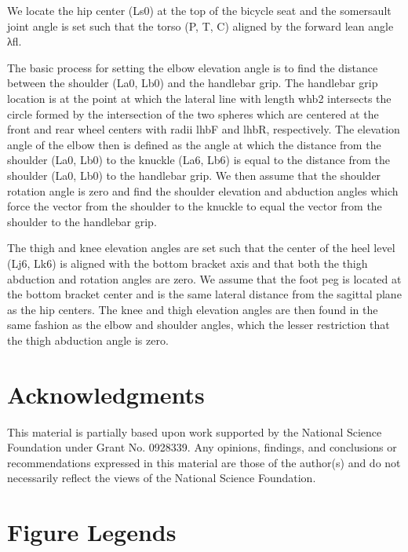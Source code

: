 \documentclass[10pt]{article}
\begin{document}
We locate the hip center (Ls0) at the top of the bicycle seat and the
somersault joint angle is set such that the torso (P, T, C) aligned by the
forward lean angle λfl.

The basic process for setting the elbow elevation angle is to find the distance
between the shoulder (La0, Lb0) and the handlebar grip. The handlebar grip
location is at the point at which the lateral line with length whb2 intersects
the circle formed by the intersection of the two spheres which are centered at
the front and rear wheel centers with radii lhbF and lhbR, respectively. The
elevation angle of the elbow then is defined as the angle at which the distance
from the shoulder (La0, Lb0) to the knuckle (La6, Lb6) is equal to the distance
from the shoulder (La0, Lb0) to the handlebar grip. We then assume that the
shoulder rotation angle is zero and find the shoulder elevation and abduction
angles which force the vector from the shoulder to the knuckle to equal the
vector from the shoulder to the handlebar grip.

The thigh and knee elevation angles are set such that the center of the heel
level (Lj6, Lk6) is aligned with the bottom bracket axis and that both the
thigh abduction and rotation angles are zero. We assume that the foot peg is
located at the bottom bracket center and is the same lateral distance from the
sagittal plane as the hip centers. The knee and thigh elevation angles are then
found in the same fashion as the elbow and shoulder angles, which the lesser
restriction that the thigh abduction angle is zero.

\section*{Acknowledgments}
This material is partially based upon work supported by the National Science
Foundation under Grant No. 0928339. Any opinions, findings, and conclusions or
recommendations expressed in this material are those of the author(s) and do
not necessarily reflect the views of the National Science Foundation.


\section*{Figure Legends}
\end{document}
